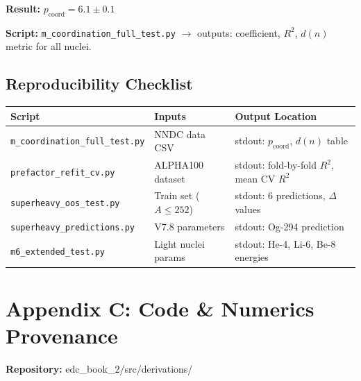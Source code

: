 \documentclass[11pt,a4paper]{article}
\begin{document}
\textbf{Result:} $p_{\mathrm{coord}} = 6.1 \pm 0.1$

\textbf{Script:} \texttt{m\_coordination\_full\_test.py} $\to$ outputs: coefficient, $R^2$, $d(n)$ metric for all nuclei.

\subsection{Reproducibility Checklist}

\begin{tabular}{p{4cm}p{4cm}p{4cm}}
\toprule
\textbf{Script} & \textbf{Inputs} & \textbf{Output Location} \\
\midrule
\texttt{m\_coordination\_full\_test.py} & NNDC data CSV & stdout: $p_{\mathrm{coord}}$, $d(n)$ table \\
\texttt{prefactor\_refit\_cv.py} & ALPHA100 dataset & stdout: fold-by-fold $R^2$, mean CV $R^2$ \\
\texttt{superheavy\_oos\_test.py} & Train set ($A \leq 252$) & stdout: 6 predictions, $\Delta$ values \\
\texttt{superheavy\_predictions.py} & V7.8 parameters & stdout: Og-294 prediction \\
\texttt{m6\_extended\_test.py} & Light nuclei params & stdout: He-4, Li-6, Be-8 energies \\
\bottomrule
\end{tabular}

\section{Appendix C: Code \& Numerics Provenance}
\label{app:code}

\textbf{Repository:} edc\_book\_2/src/derivations/
\end{document}
